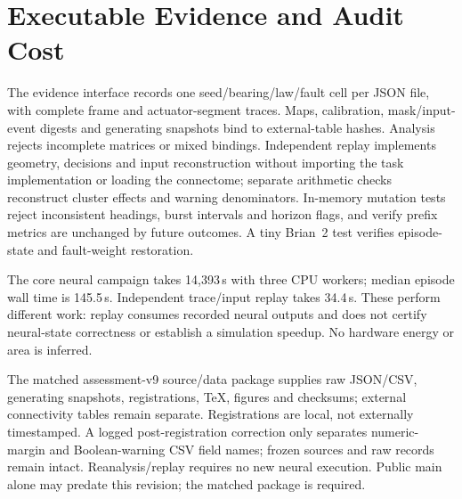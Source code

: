 \section{Executable Evidence and Audit Cost}
The evidence interface records one seed/bearing/law/fault cell per JSON file, with complete frame and actuator-segment traces. Maps, calibration, mask/input-event digests and generating snapshots bind to external-table hashes. Analysis rejects incomplete matrices or mixed bindings. Independent replay implements geometry, decisions and input reconstruction without importing the task implementation or loading the connectome; separate arithmetic checks reconstruct cluster effects and warning denominators. In-memory mutation tests reject inconsistent headings, burst intervals and horizon flags, and verify prefix metrics are unchanged by future outcomes. A tiny Brian~2 test verifies episode-state and fault-weight restoration.

The core neural campaign takes 14,393\,s with three CPU workers; median episode wall time is 145.5\,s. Independent trace/input replay takes 34.4\,s. These perform different work: replay consumes recorded neural outputs and does not certify neural-state correctness or establish a simulation speedup. No hardware energy or area is inferred.

The matched assessment-v9 source/data package supplies raw JSON/CSV, generating snapshots, registrations, TeX, figures and checksums; external connectivity tables remain separate. Registrations are local, not externally timestamped. A logged post-registration correction only separates numeric-margin and Boolean-warning CSV field names; frozen sources and raw records remain intact. Reanalysis/replay requires no new neural execution. Public main alone may predate this revision; the matched package is required.
